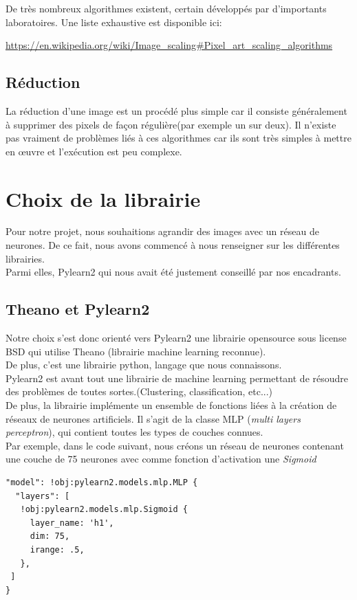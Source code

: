 \documentclass[12pt, a4paper]{article}
\begin{document}
De très nombreux algorithmes existent, certain développés par d'importants laboratoires. Une liste exhaustive est disponible ici:

\url{https://en.wikipedia.org/wiki/Image_scaling#Pixel_art_scaling_algorithms}

\subsection{Réduction}

La réduction d'une image est un procédé plus simple car il consiste généralement à supprimer des pixels de façon régulière(par exemple un sur deux). Il n'existe pas vraiment de problèmes liés à ces algorithmes car ils sont très simples à mettre en œuvre et l'exécution est peu complexe.


\section{Choix de la librairie}
Pour notre projet, nous souhaitions agrandir des images avec un réseau de neurones. De ce fait, nous avons commencé à nous renseigner sur les différentes librairies. \\ Parmi elles, Pylearn2 qui nous avait été justement conseillé par nos encadrants. 
\subsection{Theano et Pylearn2}
Notre choix s'est donc orienté vers Pylearn2 une librairie opensource sous license BSD qui utilise Theano (librairie machine learning reconnue).
\\ De plus, c'est une librairie python, langage que nous connaissons.
\\

Pylearn2 est avant tout une librairie de machine learning permettant de résoudre des problèmes de toutes sortes.(Clustering, classification, etc...)
\\De plus, la librairie implémente un ensemble de fonctions liées à la création de réseaux de neurones artificiels. Il s'agit de la classe MLP (\emph{multi layers perceptron}), qui contient toutes les types de couches connues. \\ Par exemple, dans le code suivant, nous créons un réseau de neurones contenant une couche de 75 neurones avec comme fonction d'activation une \emph{Sigmoid}
\begin{verbatim}
"model": !obj:pylearn2.models.mlp.MLP {
  "layers": [
   !obj:pylearn2.models.mlp.Sigmoid {
     layer_name: 'h1',
     dim: 75,
     irange: .5,
   },
 ]
}
\end{verbatim}
\end{document}
